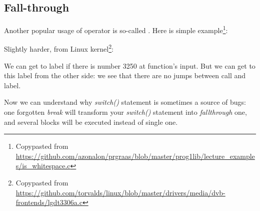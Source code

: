 ﻿\subsection{Fall-through}

Another popular usage of  operator is so-called .
Here is simple example\footnote{Copypasted from \url{https://github.com/azonalon/prgraas/blob/master/prog1lib/lecture_examples/is_whitespace.c}}:



Slightly harder, from Linux kernel\footnote{Copypasted from \url{https://github.com/torvalds/linux/blob/master/drivers/media/dvb-frontends/lgdt3306a.c}}:





We can get to  label if there is number 3250 at function's input.
But we can get to this label from the other side:
we see that there are no jumps between \printf call and  label.

Now we can understand why \emph{switch()} statement is sometimes a source of bugs:
one forgotten \emph{break} will transform your
\emph{switch()} statement into \emph{fallthrough} one, and several blocks will be executed instead of single one.

